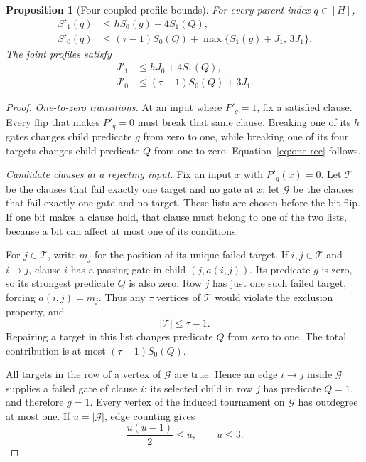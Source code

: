 \documentclass[11pt]{article}
\newtheorem{proposition}[theorem]{Proposition}
\theoremstyle{definition}
\theoremstyle{remark}
\begin{document}
\begin{proposition}[Four coupled profile bounds]
\label{prop:recurrences}
For every parent index $q\in[H]$,
\begin{align}
 S'_1(q)&\le hS_0(g)+4S_1(Q),
 \label{eq:one-rec}\\
 S'_0(q)&\le (\tau-1)S_0(Q)
                  +\max\{S_1(g)+J_1,\,3J_1\}.
 \label{eq:zero-rec}
\end{align}
The joint profiles satisfy
\begin{align}
 J'_1&\le hJ_0+4S_1(Q),
 \label{eq:joint-one-rec}\\
 J'_0&\le (\tau-1)S_0(Q)+3J_1.
 \label{eq:joint-zero-rec}
\end{align}
\end{proposition}

\begin{proof}
\emph{One-to-zero transitions.}
At an input where $P'_q=1$, fix a satisfied clause.  Every flip that
makes $P'_q=0$ must break that same clause.  Breaking one of its $h$
gates changes child predicate $g$ from zero to one, while breaking one
of its four targets changes child predicate $Q$ from one to zero.
Equation~\eqref{eq:one-rec} follows.

\emph{Candidate clauses at a rejecting input.}
Fix an input $x$ with $P'_q(x)=0$.  Let $\mathcal T$ be the clauses
that fail exactly one target and no gate at $x$; let $\mathcal G$ be
the clauses that fail exactly one gate and no target.  These lists are
chosen before the bit flip.  If one bit makes a clause hold, that
clause must belong to one of the two lists, because a bit can affect
at most one of its conditions.

For $j\in\mathcal T$, write $m_j$ for the position of its unique
failed target.  If $i,j\in\mathcal T$ and $i\to j$, clause $i$ has
a passing gate in child $(j,a(i,j))$.  Its predicate $g$ is zero, so
its strongest predicate $Q$ is also zero.  Row $j$ has just one such
failed target, forcing $a(i,j)=m_j$.  Thus any $\tau$ vertices of
$\mathcal T$ would violate the exclusion property, and
\[
                         |\mathcal T|\le\tau-1.
\]
Repairing a target in this list changes predicate $Q$ from zero to
one.  The total contribution is at most $(\tau-1)S_0(Q)$.

All targets in the row of a vertex of $\mathcal G$ are true.  Hence an
edge $i\to j$ inside $\mathcal G$ supplies a failed gate of clause
$i$: its selected child in row $j$ has predicate $Q=1$, and therefore
$g=1$.  Every vertex of the induced tournament on $\mathcal G$ has
outdegree at most one.  If $u=|\mathcal G|$, edge counting gives
\[
                         \frac{u(u-1)}2\le u,
                         \qquad u\le3.
\]


\end{proof}
\end{document}
